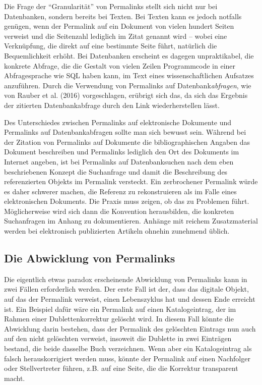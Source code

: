 \documentclass[12pt, a4paper]{article}
\begin{document}
Die Frage der "`Granularität"' von Permalinks stellt sich nicht nur
bei Datenbanken, sondern bereits bei Texten. Bei Texten kann es jedoch
notfalls genügen, wenn der Permalink auf ein Dokument von vielen
hundert Seiten verweist und die Seitenzahl lediglich im Zitat genannt
wird -- wobei eine Verknüpfung, die direkt auf eine bestimmte Seite
führt, natürlich die Bequemlichkeit erhöht. Bei Datenbanken erscheint
es dagegen unpraktikabel, die konkrete Abfrage, die die Gestalt von
vielen Zeilen Programmcode in einer Abfragesprache wie SQL haben kann,
im Text eines wissenschaftlichen Aufsatzes anzuführen. Durch die
Verwendung von Permalinks auf Datenbank{\em abfragen}, wie von Rauber
et al. (2016) vorgeschlagen, erübrigt sich das, da sich das Ergebnis
der zitierten Datenbankabfrage durch den Link wiederherstellen lässt.

Des Unterschiedes zwischen Permalinks auf elektronische Dokumente und
Permalinks auf Datenbankabfragen sollte man sich bewusst sein. Während
bei der Zitation von Permalinks auf Dokumente die bibliographischen
Angaben das Dokument beschreiben und Permalinks lediglich den Ort des
Dokuments im Internet angeben, ist bei Permalinks auf Datenbanksuchen
nach dem eben beschriebenen Konzept die Suchanfrage und damit die
Beschreibung des referenzierten Objekts im Permalink versteckt. Ein
zerbrochener Permalink würde es daher schwerer machen, die Referenz zu
rekonstruieren als im Falle eines elektronischen Dokuments. Die Praxis
muss zeigen, ob das zu Problemen führt. Möglicherweise wird sich dann
die Konvention herausbilden, die konkreten Suchanfragen im Anhang
zu dokumentieren. Anhänge mit reichem Zusatzmaterial werden bei
elektronisch publizierten Artikeln ohnehin zunehmend üblich.

\subsection{Die Abwicklung von Permalinks}
\label{die-abwicklung-von-permalinks}

Die eigentlich etwas paradox erscheinende Abwicklung von Permalinks
kann in zwei Fällen erforderlich werden. Der erste Fall ist der, dass
das digitale Objekt, auf das der Permalink verweist, einen
Lebenszyklus hat und dessen Ende erreicht ist. Ein Beispiel dafür wäre
ein Permalink auf einen Katalogeintrag, der im Rahmen einer
Dublettenkorrektur gelöscht wird. In diesem Fall könnte die Abwicklung
darin bestehen, dass der Permalink des gelöschten Eintrags nun auch
auf den nicht gelöschten verweist, insoweit die Dublette in zwei
Einträgen bestand, die beide dasselbe Buch verzeichnen. Wenn aber ein
Katalogeintrag als falsch herauskorrigiert werden muss, könnte der
Permalink auf einen Nachfolger oder Stellvertreter führen, z.B. auf
eine Seite, die die Korrektur transparent macht.
\end{document}
